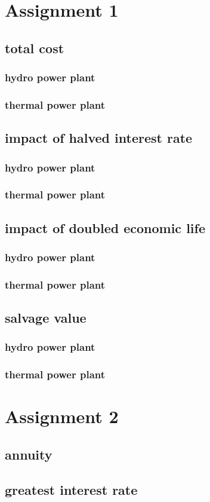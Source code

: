 \documentclass{article}
\begin{document}
\section{Assignment 1}
\subsection{total cost}
\subsubsection{hydro power plant}
\subsubsection{thermal power plant}
\subsection{impact of halved interest rate}
\subsubsection{hydro power plant}
\subsubsection{thermal power plant}
\subsection{impact of doubled economic life}
\subsubsection{hydro power plant}
\subsubsection{thermal power plant}
\subsection{salvage value}
\subsubsection{hydro power plant}
\subsubsection{thermal power plant}
\section{Assignment 2}
\subsection{annuity}
\subsection{greatest interest rate}
\end{document}

